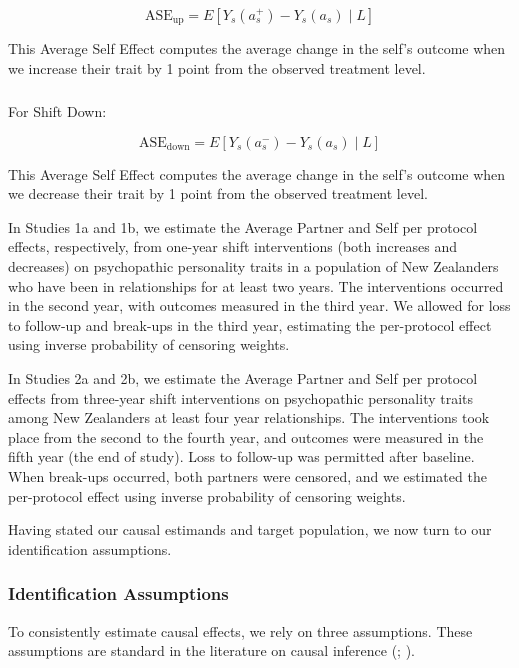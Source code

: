 \documentclass[
  singlecolumn]{article}
\makeatletter
\let\oldsubparagraph\subparagraph
\renewcommand{\subparagraph}{
    \@ifstar
      \xxxSubParagraphStar
      \xxxSubParagraphNoStar
  }
\newcommand{\xxxSubParagraphStar}[1]{\oldsubparagraph*{#1}\mbox{}}
\newcommand{\xxxSubParagraphNoStar}[1]{\oldsubparagraph{#1}\mbox{}}
\makeatother
\begin{document}
\[
\text{ASE}_{\text{up}} = E\left[ Y_s(a_s^+) - Y_s(a_s) \mid L \right]
\]

This Average Self Effect computes the average change in the self's
outcome when we increase their trait by 1 point from the observed
treatment level.

\subparagraph{For Shift Down:}\label{for-shift-down-1}

\[
\text{ASE}_{\text{down}} = E\left[ Y_s(a_s^-) - Y_s(a_s) \mid L \right]
\]

This Average Self Effect computes the average change in the self's
outcome when we decrease their trait by 1 point from the observed
treatment level.

In Studies 1a and 1b, we estimate the Average Partner and Self per
protocol effects, respectively, from one-year shift interventions (both
increases and decreases) on psychopathic personality traits in a
population of New Zealanders who have been in relationships for at least
two years. The interventions occurred in the second year, with outcomes
measured in the third year. We allowed for loss to follow-up and
break-ups in the third year, estimating the per-protocol effect using
inverse probability of censoring weights.

In Studies 2a and 2b, we estimate the Average Partner and Self per
protocol effects from three-year shift interventions on psychopathic
personality traits among New Zealanders at least four year
relationships. The interventions took place from the second to the
fourth year, and outcomes were measured in the fifth year (the end of
study). Loss to follow-up was permitted after baseline. When break-ups
occurred, both partners were censored, and we estimated the per-protocol
effect using inverse probability of censoring weights.

Having stated our causal estimands and target population, we now turn to
our identification assumptions.

\subsubsection{Identification
Assumptions}\label{identification-assumptions}

To consistently estimate causal effects, we rely on three assumptions.
These assumptions are standard in the literature on causal inference
(;
).
\end{document}
